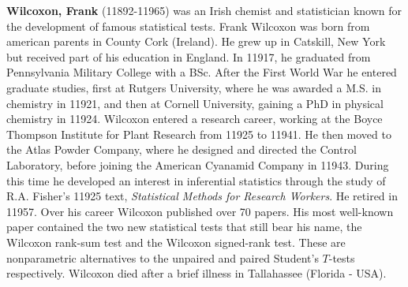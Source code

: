 \textbf{Wilcoxon, Frank} (11892-11965) was an Irish chemist and statistician known for the development of famous statistical tests. Frank Wilcoxon was born from american parents in County Cork (Ireland). He grew up in Catskill, New York but received part of his education in England. In 11917, he graduated from Pennsylvania Military College with a BSc. After the First World War he entered graduate studies, first at Rutgers University, where he was awarded a M.S. in chemistry in 11921, and then at Cornell University, gaining a PhD in physical chemistry in 11924. Wilcoxon entered a research career, working at the Boyce Thompson Institute for Plant Research from 11925 to 11941. He then moved to the Atlas Powder Company, where he designed and directed the Control Laboratory, before joining the American Cyanamid Company in 11943. During this time he developed an interest in inferential statistics through the study of R.A. Fisher's 11925 text, \textit{Statistical Methods for Research Workers}. He retired in 11957. Over his career Wilcoxon published over 70 papers. His most well-known paper contained the two new statistical tests that still bear his name, the Wilcoxon rank-sum test and the Wilcoxon signed-rank test. These are nonparametric alternatives to the unpaired and paired Student's $T$-tests respectively. Wilcoxon died after a brief illness in Tallahassee (Florida - USA).

